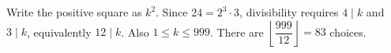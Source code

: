 Write the positive square as $k^2$. Since $24=2^3\cdot3$, divisibility requires $4\mid k$ and $3\mid k$, equivalently $12\mid k$. Also $1\le k\le999$. There are $\left\lfloor\dfrac{999}{12}\right\rfloor=\boxed{83}$ choices.
